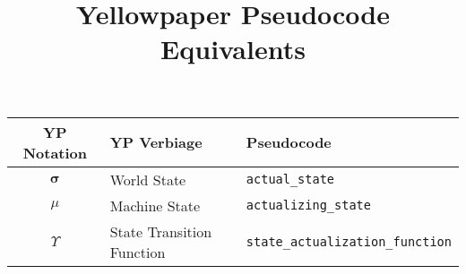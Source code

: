 \documentclass[9pt,a4paper,oneside]{scrartcl}
\author{}
\title{Yellowpaper Pseudocode Equivalents}
\date{}
\begin{document}
\maketitle

\begin{tabular}{|cll|}
	\hline
	\textbf{YP Notation} & \textbf{YP Verbiage} & \textbf{Pseudocode} \\
	\hline
	$\boldsymbol{\sigma}$ & World State & \texttt{actual\_state} \\
	$\mu$ & Machine State & \texttt{actualizing\_state} \\
	$\Upsilon$ & State Transition Function & \texttt{state\_actualization\_function} \\
	\hline
\end{tabular}


\printbibliography
\end{document}
